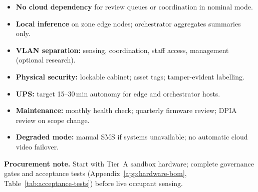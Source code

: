 \begin{itemize}[noitemsep]
  \item \textbf{No cloud dependency} for review queues or coordination in nominal mode.
  \item \textbf{Local inference} on zone edge nodes; orchestrator aggregates summaries only.
  \item \textbf{VLAN separation:} sensing, coordination, staff access, management (optional research).
  \item \textbf{Physical security:} lockable cabinet; asset tags; tamper-evident labelling.
  \item \textbf{UPS:} target 15--30\,min autonomy for edge and orchestrator hosts.
  \item \textbf{Maintenance:} monthly health check; quarterly firmware review; DPIA review on scope change.
  \item \textbf{Degraded mode:} manual SMS if systems unavailable; no automatic cloud video failover.
\end{itemize}

\noindent\textbf{Procurement note.}
Start with Tier~A sandbox hardware; complete governance gates and acceptance tests
(Appendix~\ref{app:hardware-bom}, Table~\ref{tab:acceptance-tests}) before live occupant sensing.
